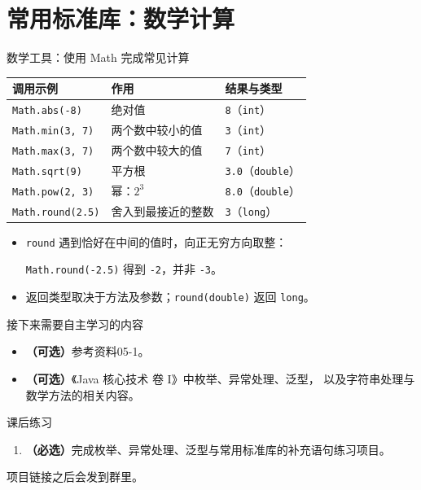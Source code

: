 \documentclass[aspectratio=169]{beamer}
\begin{document}
\section{常用标准库：数学计算}

\begin{frame}{数学工具：使用 Math 完成常见计算}
  \begin{center}
    \renewcommand{\arraystretch}{1.2}
    \begin{tabular}{lll}
      \textbf{调用示例} & \textbf{作用} & \textbf{结果与类型} \\
      \hline
      \texttt{Math.abs(-8)} & 绝对值 & \texttt{8}（\texttt{int}） \\
      \texttt{Math.min(3, 7)} & 两个数中较小的值 & \texttt{3}（\texttt{int}） \\
      \texttt{Math.max(3, 7)} & 两个数中较大的值 & \texttt{7}（\texttt{int}） \\
      \texttt{Math.sqrt(9)} & 平方根 & \texttt{3.0}（\texttt{double}） \\
      \texttt{Math.pow(2, 3)} & 幂：$2^3$ & \texttt{8.0}（\texttt{double}） \\
      \texttt{Math.round(2.5)} & 舍入到最接近的整数 & \texttt{3}（\texttt{long}） \\
    \end{tabular}
  \end{center}
  \medskip
  \begin{itemize}
    \item \texttt{round} 遇到恰好在中间的值时，向正无穷方向取整：\par
      \texttt{Math.round(-2.5)} 得到 \texttt{-2}，并非 \texttt{-3}。
    \item 返回类型取决于方法及参数；\texttt{round(double)} 返回 \texttt{long}。
  \end{itemize}
\end{frame}

\begin{frame}{接下来需要自主学习的内容}
  \begin{itemize}
    \item \textbf{（可选）}参考资料05-1。
    \item \textbf{（可选）}《Java 核心技术 卷 I》中枚举、异常处理、泛型，
      以及字符串处理与数学方法的相关内容。
  \end{itemize}
\end{frame}

\begin{frame}{课后练习}
  \begin{enumerate}
    \item \textbf{（必选）}完成枚举、异常处理、泛型与常用标准库的补充语句练习项目。
  \end{enumerate}
  \bigskip
  项目链接之后会发到群里。
\end{frame}
\end{document}
